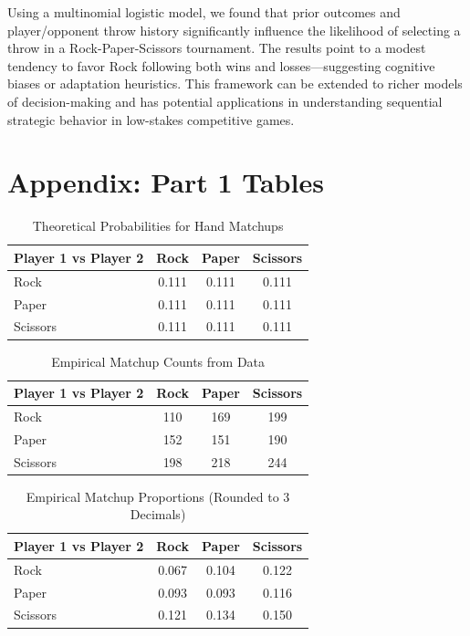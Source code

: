 \documentclass[12pt]{article}
\begin{document}
Using a multinomial logistic model, we found that prior outcomes and player/opponent throw history significantly influence the likelihood of selecting a throw in a Rock-Paper-Scissors tournament. The results point to a modest tendency to favor Rock following both wins and losses—suggesting cognitive biases or adaptation heuristics. This framework can be extended to richer models of decision-making and has potential applications in understanding sequential strategic behavior in low-stakes competitive games.

\newpage
\section*{Appendix: Part 1 Tables}

\begin{table}[H]
\centering
\caption{Theoretical Probabilities for Hand Matchups}
\label{tab:theoretical_matrix}
\begin{tabular}{lccc}
\toprule
\textbf{Player 1 vs Player 2} & \textbf{Rock} & \textbf{Paper} & \textbf{Scissors} \\
\midrule
Rock     & 0.111 & 0.111 & 0.111 \\
Paper    & 0.111 & 0.111 & 0.111 \\
Scissors & 0.111 & 0.111 & 0.111 \\
\bottomrule
\end{tabular}
\end{table}

\begin{table}[H]
\centering
\caption{Empirical Matchup Counts from Data}
\label{tab:empirical_counts}
\begin{tabular}{lccc}
\toprule
\textbf{Player 1 vs Player 2} & \textbf{Rock} & \textbf{Paper} & \textbf{Scissors} \\
\midrule
Rock     & 110 & 169 & 199 \\
Paper    & 152 & 151 & 190 \\
Scissors & 198 & 218 & 244 \\
\bottomrule
\end{tabular}
\end{table}

\begin{table}[H]
\centering
\caption{Empirical Matchup Proportions (Rounded to 3 Decimals)}
\label{tab:empirical_proportions}
\begin{tabular}{lccc}
\toprule
\textbf{Player 1 vs Player 2} & \textbf{Rock} & \textbf{Paper} & \textbf{Scissors} \\
\midrule
Rock     & 0.067 & 0.104 & 0.122 \\
Paper    & 0.093 & 0.093 & 0.116 \\
Scissors & 0.121 & 0.134 & 0.150 \\
\bottomrule
\end{tabular}
\end{table}
\end{document}
